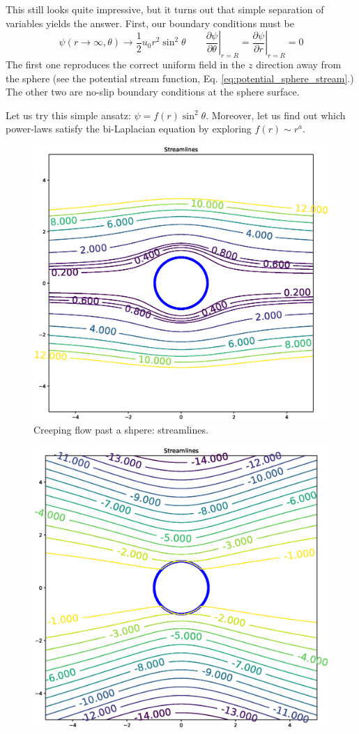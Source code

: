This still looks quite impressive, but it turns out that simple
separation of variables yields the answer. First, our boundary
conditions must be
\[
  \psi(r \to \infty ,\theta) \to \frac12 u_0 r^2 \sin^2\theta
  \qquad
  \left.\frac{\partial \psi}{\partial \theta}\right|_{r=R} =
  \left.\frac{\partial \psi}{\partial r}\right|_{r=R} = 0
\]
The first one reproduces the correct uniform field in the $z$
direction away from the sphere (see the potential stream function,
Eq. \ref{eq:potential_sphere_stream}.) The other two are no-slip
boundary conditions at the sphere surface.

Let us try this simple ansatz: $\psi=f(r) \sin^2\theta$. Moreover, let
us find out which power-laws satisfy the bi-Laplacian equation by
exploring $f(r) \sim r^a$.


\begin{figure}
  \centering
  \includegraphics[width=0.8\linewidth]{figures/creeping_flow_past_sphere}
  \caption{Creeping flow past a shpere: streamlines. \label{fig:creeping_flow_past_sphere}}
\end{figure}


\begin{figure}
  \centering
  \includegraphics[width=0.8\linewidth]{figures/creeping_flow_past_sphere_moving}
  \caption{\label{fig:creeping_flow_past_sphere_moving}}
\end{figure}




